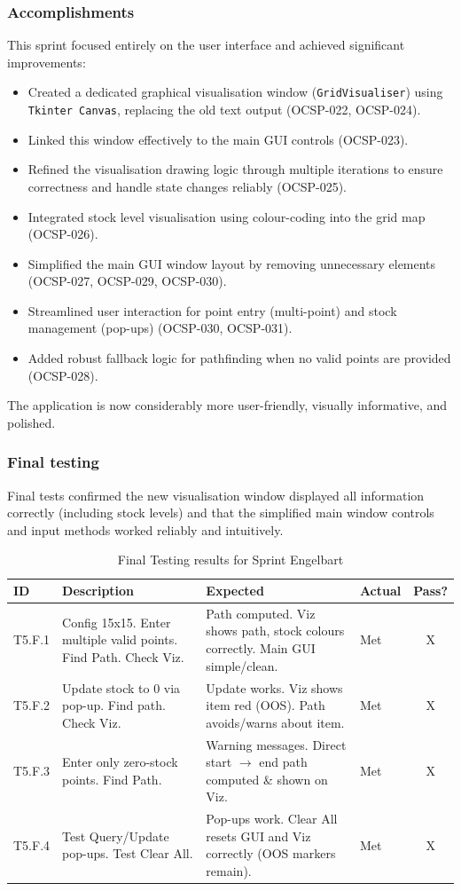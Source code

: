 \subsubsection{Accomplishments}
This sprint focused entirely on the user interface and achieved significant improvements:
\begin{itemize}
	\item Created a dedicated graphical visualisation window (\verb|GridVisualiser|) using \verb|Tkinter Canvas|, replacing the old text output (OCSP-022, OCSP-024).
	\item Linked this window effectively to the main GUI controls (OCSP-023).
	\item Refined the visualisation drawing logic through multiple iterations to ensure correctness and handle state changes reliably (OCSP-025).
	\item Integrated stock level visualisation using colour-coding into the grid map (OCSP-026).
	\item Simplified the main GUI window layout by removing unnecessary elements (OCSP-027, OCSP-029, OCSP-030).
	\item Streamlined user interaction for point entry (multi-point) and stock management (pop-ups) (OCSP-030, OCSP-031).
	\item Added robust fallback logic for pathfinding when no valid points are provided (OCSP-028).
\end{itemize}
The application is now considerably more user-friendly, visually informative, and polished.

\subsubsection{Final testing}
Final tests confirmed the new visualisation window displayed all information correctly (including stock levels) and that the simplified main window controls and input methods worked reliably and intuitively.

\begin{table}[htbp] %
	\centering
	\begin{tabularx}{\textwidth}{|l|X|p{3.5cm}|p{3.5cm}|c|}
		\hline
		\textbf{ID} & \textbf{Description} & \textbf{Expected} & \textbf{Actual} & \textbf{Pass?} \\
		\hline
		T5.F.1 & Config 15x15. Enter multiple valid points. Find Path. Check Viz. & Path computed. Viz shows path, stock colours correctly. Main GUI simple/clean. & Met & X \\
		\hline
		T5.F.2 & Update stock to 0 via pop-up. Find path. Check Viz. & Update works. Viz shows item red (OOS). Path avoids/warns about item. & Met & X \\
		\hline
		T5.F.3 & Enter only zero-stock points. Find Path. & Warning messages. Direct start $\rightarrow$ end path computed \& shown on Viz. & Met & X \\
		\hline
		T5.F.4 & Test Query/Update pop-ups. Test Clear All. & Pop-ups work. Clear All resets GUI and Viz correctly (OOS markers remain). & Met & X \\
		\hline
	\end{tabularx}
	\caption{Final Testing results for Sprint Engelbart}
\end{table}

